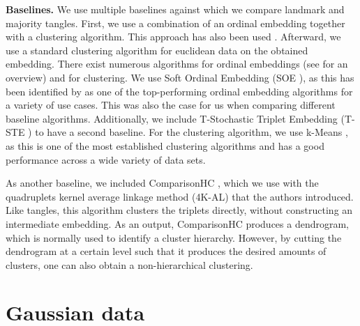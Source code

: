 \noindent
\textbf{Baselines.}
We use multiple baselines against which we compare landmark and majority tangles.
First, we use a combination of an ordinal embedding together with a clustering algorithm. This approach has also been used \cite{kleindessnerLensDepthFunction2017}. 
Afterward, we use a standard clustering algorithm for euclidean data on the obtained embedding.  
There exist numerous algorithms for ordinal embeddings (see \cite{vankadaraInsightsOrdinalEmbedding2021} for an overview) and for clustering.  
We use Soft Ordinal Embedding (SOE \cite{teradaLocalOrdinalEmbedding2014}), as this has been identified by \cite{vankadaraInsightsOrdinalEmbedding2021} as one of the 
top-performing ordinal embedding algorithms for a variety of use cases. This was also the case for us when comparing different baseline algorithms.
Additionally, we include T-Stochastic Triplet Embedding (T-STE \cite{laurensvandermaatenStochasticTripletEmbedding2012}) 
to have a second baseline. For the clustering algorithm, we use k-Means \citep{lloydLeastSquaresQuantization1982}, as this is one of the most established clustering algorithms 
and has a good performance across a wide variety of data sets.

As another baseline, we included ComparisonHC \citep{ghoshdastidarFoundationsComparisonBasedHierarchical2019}, which we use with the quadruplets kernel average linkage method (4K-AL) 
that the authors introduced.
Like tangles, this algorithm clusters the triplets directly, without constructing an intermediate embedding.
As an output, ComparisonHC produces a dendrogram, which is normally used to identify a cluster hierarchy. However, by cutting the dendrogram at a certain level such that it produces the desired 
amounts of clusters, one can also obtain a non-hierarchical clustering. \\

\section{Gaussian data}\label{sec:gaussian_data}
